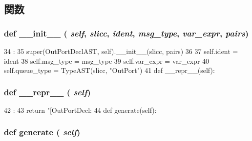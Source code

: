 \subsection{関数}
\hypertarget{classslicc_1_1ast_1_1OutPortDeclAST_1_1OutPortDeclAST_ac775ee34451fdfa742b318538164070e}{
\subsubsection[{\_\-\_\-init\_\-\_\-}]{\setlength{\rightskip}{0pt plus 5cm}def \_\-\_\-init\_\-\_\- ( {\em self}, \/   {\em slicc}, \/   {\em ident}, \/   {\em msg\_\-type}, \/   {\em var\_\-expr}, \/   {\em pairs})}}
\label{classslicc_1_1ast_1_1OutPortDeclAST_1_1OutPortDeclAST_ac775ee34451fdfa742b318538164070e}



\begin{DoxyCode}
34                                                                :
35         super(OutPortDeclAST, self).__init__(slicc, pairs)
36 
37         self.ident = ident
38         self.msg_type = msg_type
39         self.var_expr = var_expr
40         self.queue_type = TypeAST(slicc, "OutPort")
41 
    def __repr__(self):
\end{DoxyCode}
\hypertarget{classslicc_1_1ast_1_1OutPortDeclAST_1_1OutPortDeclAST_ad8b9328939df072e4740cd9a63189744}{
\subsubsection[{\_\-\_\-repr\_\-\_\-}]{\setlength{\rightskip}{0pt plus 5cm}def \_\-\_\-repr\_\-\_\- ( {\em self})}}
\label{classslicc_1_1ast_1_1OutPortDeclAST_1_1OutPortDeclAST_ad8b9328939df072e4740cd9a63189744}



\begin{DoxyCode}
42                       :
43         return "[OutPortDecl: %
44 
    def generate(self):
\end{DoxyCode}
\hypertarget{classslicc_1_1ast_1_1OutPortDeclAST_1_1OutPortDeclAST_a4555d1cee0dccf3942ea35fe86de2e8e}{
\subsubsection[{generate}]{\setlength{\rightskip}{0pt plus 5cm}def generate ( {\em self})}}
\label{classslicc_1_1ast_1_1OutPortDeclAST_1_1OutPortDeclAST_a4555d1cee0dccf3942ea35fe86de2e8e}



